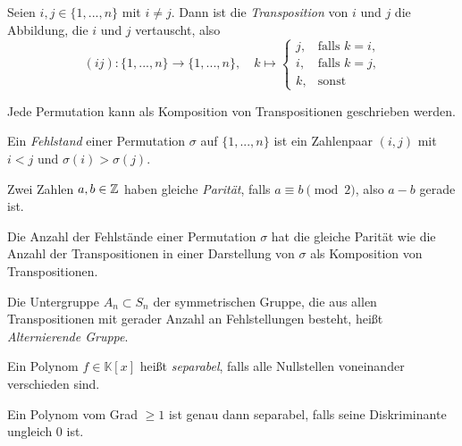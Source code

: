 \documentclass{cheat-sheet}
\newcommand{\K}{\mathbb{K}} %
\begin{document}

\begin{defn}
  Seien $i, j \in \{ 1, ..., n \}$ mit $i \not= j$. Dann ist die \emph{Transposition} von $i$ und $j$ die Abbildung, die $i$ und $j$ vertauscht, also
  \[
    (ij) : \{ 1, ..., n \} \to \{ 1, ..., n \}, \quad k \mapsto \begin{cases}
      j, & \text{falls $k = i$,}\\
      i, & \text{falls $k = j$,}\\
      k, & \text{sonst}
    \end{cases}
  \]
\end{defn}

\begin{bem}
  Jede Permutation kann als Komposition von Transpositionen geschrieben werden.
\end{bem}

\begin{defn}
  Ein \emph{Fehlstand} einer Permutation $\sigma$ auf $\{ 1, ..., n \}$ ist ein Zahlenpaar $(i, j)$ mit $i < j$ und $\sigma(i) > \sigma(j)$.
\end{defn}

\begin{defn}
  Zwei Zahlen $a, b \in \mathbb{Z}$ haben gleiche \emph{Parität}, falls $a \equiv b \pmod{2}$, also $a - b$ gerade ist.
\end{defn}

\begin{prop}
  Die Anzahl der Fehlstände einer Permutation $\sigma$ hat die gleiche Parität wie die Anzahl der Transpositionen in einer Darstellung von $\sigma$ als Komposition von Transpositionen.
\end{prop}

\begin{defn}
  Die Untergruppe $A_n \subset S_n$ der symmetrischen Gruppe, die aus allen Transpositionen mit gerader Anzahl an Fehlstellungen besteht, heißt \emph{Alternierende Gruppe}.
\end{defn}


\begin{defn}
  Ein Polynom $f \in \K[x]$ heißt \emph{separabel}, falls alle Nullstellen voneinander verschieden sind.
\end{defn}

\begin{bem}
  Ein Polynom vom Grad $\geq 1$ ist genau dann separabel, falls seine Diskriminante ungleich $0$ ist.
\end{bem}
\end{document}
